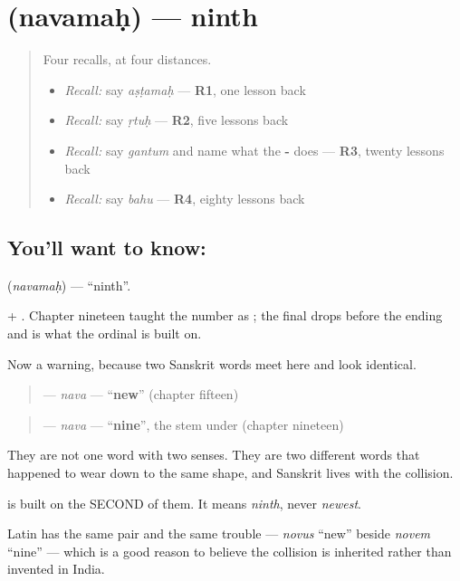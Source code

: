 \section[\texorpdfstring{\sk{नवमः} (navamaḥ)}{नवमः (navamaḥ)}]{ (navamaḥ) — ninth}

\label{lesson:SA-C62-ninth}



\begin{quote}
Four recalls, at four distances.

\begin{itemize}
\raggedright
  \item \emph{Recall:} say \emph{aṣṭamaḥ} — \textbf{R1}, one lesson back
  \item \emph{Recall:} say \emph{ṛtuḥ} — \textbf{R2}, five lessons back
  \item \emph{Recall:} say \emph{gantum} and name what the \textbf{-} does — \textbf{R3}, twenty lessons back
  \item \emph{Recall:} say \emph{bahu} — \textbf{R4}, eighty lessons back
\end{itemize}
\end{quote}

\subsection*{You'll want to know: }
\textbf{} (\emph{navamaḥ}) — \textquotedblleft{}ninth\textquotedblright{}.

\textbf{} + \textbf{}. Chapter nineteen taught the number as \textbf{}; the final \textbf{} drops before the ending and \textbf{} is what the ordinal is built on.

\begin{cousinweb}
Now a warning, because two Sanskrit words meet here and look identical.

\begin{quote}
\textbf{} — \emph{nava} — \textquotedblleft{}\textbf{new}\textquotedblright{} (chapter fifteen)
\end{quote}

\begin{quote}
\textbf{} — \emph{nava} — \textquotedblleft{}\textbf{nine}\textquotedblright{}, the stem under \textbf{} (chapter nineteen)
\end{quote}

They are not one word with two senses. They are two different words that happened to wear down to the same shape, and Sanskrit lives with the collision.

\textbf{} is built on the SECOND of them. It means \emph{ninth}, never \emph{newest}.

Latin has the same pair and the same trouble — \emph{novus} \textquotedblleft{}new\textquotedblright{} beside \emph{novem} \textquotedblleft{}nine\textquotedblright{} — which is a good reason to believe the collision is inherited rather than invented in India.
\end{cousinweb}

